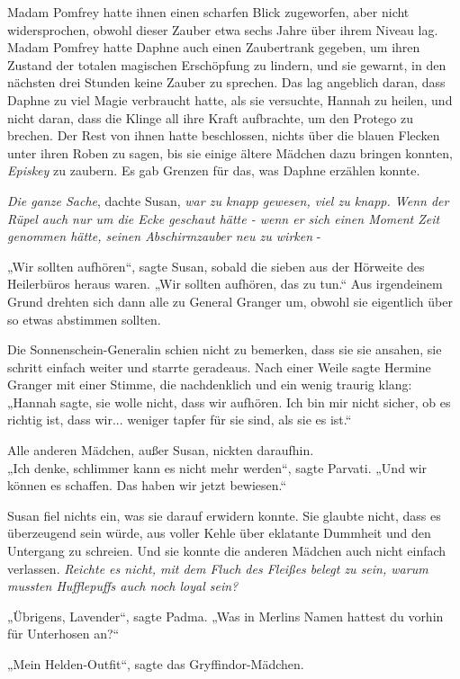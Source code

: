 {Madam Pomfrey hatte ihnen einen scharfen Blick zugeworfen, aber nicht widersprochen, obwohl dieser Zauber etwa sechs Jahre über ihrem Niveau lag. Madam Pomfrey hatte Daphne auch einen Zaubertrank gegeben, um ihren Zustand der totalen magischen Erschöpfung zu lindern, und sie gewarnt, in den nächsten drei Stunden keine Zauber zu sprechen. Das lag angeblich daran, dass Daphne zu viel Magie verbraucht hatte, als sie versuchte, Hannah zu heilen, und nicht daran, dass die Klinge all ihre Kraft aufbrachte, um den Protego zu brechen. Der Rest von ihnen hatte beschlossen, nichts über die blauen Flecken unter ihren Roben zu sagen, bis sie einige ältere Mädchen dazu bringen konnten, \emph{Episkey} zu zaubern. Es gab Grenzen für das, was Daphne erzählen konnte.

\emph{Die ganze Sache}, dachte Susan, \emph{war zu knapp gewesen, viel zu knapp. Wenn der Rüpel auch nur um die Ecke geschaut hätte - wenn er sich einen Moment Zeit genommen hätte, seinen Abschirmzauber neu zu wirken} -

„Wir sollten aufhören“, sagte Susan, sobald die sieben aus der Hörweite des Heilerbüros heraus waren. „Wir sollten aufhören, das zu tun.“ Aus irgendeinem Grund drehten sich dann alle zu General Granger um, obwohl sie eigentlich über so etwas abstimmen sollten.

Die Sonnenschein-Generalin schien nicht zu bemerken, dass sie sie ansahen, sie schritt einfach weiter und starrte geradeaus. Nach einer Weile sagte Hermine Granger mit einer Stimme, die nachdenklich und ein wenig traurig klang: „Hannah sagte, sie wolle nicht, dass wir aufhören. Ich bin mir nicht sicher, ob es richtig ist, dass wir... weniger tapfer für sie sind, als sie es ist.“

Alle anderen Mädchen, außer Susan, nickten daraufhin.\\ „Ich denke, schlimmer kann es nicht mehr werden“, sagte Parvati. „Und wir können es schaffen. Das haben wir jetzt bewiesen.“

Susan fiel nichts ein, was sie darauf erwidern konnte. Sie glaubte nicht, dass es überzeugend sein würde, aus voller Kehle über eklatante Dummheit und den Untergang zu schreien. Und sie konnte die anderen Mädchen auch nicht einfach verlassen. \emph{Reichte es nicht, mit dem Fluch des Fleißes belegt zu sein, warum mussten Hufflepuffs auch noch loyal sein?}

„Übrigens, Lavender“, sagte Padma. „Was in Merlins Namen hattest du vorhin für Unterhosen an?“

„Mein Helden-Outfit“, sagte das Gryffindor-Mädchen.

}
